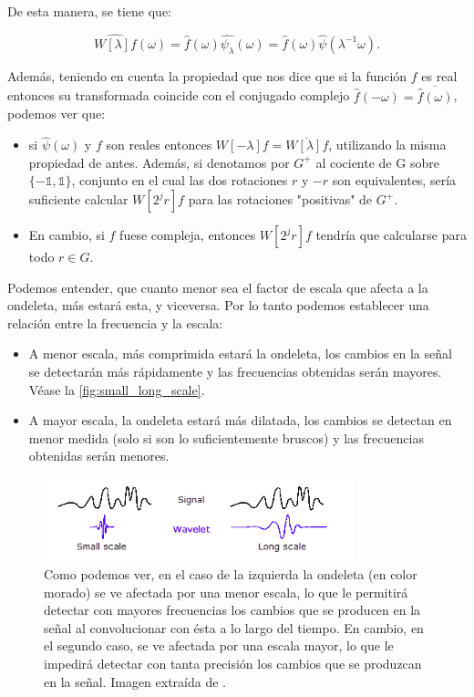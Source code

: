 De esta manera, se tiene que: 

$$\widehat{W[\lambda]f}(\omega)=\widehat{f}(\omega)\widehat{\psi_\lambda}(\omega)=\widehat{f}(\omega)\widehat{\psi}(\lambda^{-1}\omega).$$

\noindent Además, teniendo en cuenta la propiedad que nos dice que si la función $f$ es real entonces su transformada coincide con el conjugado complejo $\widehat{f}(-\omega)=\overline{\widehat{f}(\omega)}$, podemos ver que: 

\begin{itemize}
  \item si $\widehat{\psi}(\omega)$ y $f$ son reales entonces $W[-\lambda]f= \overline{W[\lambda]f}$, utilizando la misma propiedad de antes. Además, si denotamos por $G^{+}$ al cociente de G sobre $\lbrace-\mathbb{1},\mathbb{1}\rbrace$, conjunto en el cual las dos rotaciones $r$ y $-r$ son equivalentes, sería suficiente calcular $W[2^jr]f$ para las rotaciones "positivas" de $G^{+}$.
  \item En cambio, si $f$ fuese compleja, entonces $W[2^jr]f$ tendría que calcularse para todo $r \in G$.
\end{itemize}

\medskip
 
\noindent Podemos entender, que cuanto menor sea el factor de escala que afecta a la ondeleta, más  estará esta, y viceversa. Por lo tanto podemos establecer una relación entre la frecuencia y la escala: 

\begin{itemize}
  \item A menor escala, más comprimida estará la ondeleta, los cambios en la señal se detectarán más rápidamente y las frecuencias obtenidas serán mayores. Véase la \autoref{fig:small_long_scale}.
  \item A mayor escala, la ondeleta estará más dilatada, los cambios se detectan en menor medida (solo si son lo suficientemente bruscos) y las frecuencias obtenidas serán menores.
\end{itemize}

\begin{figure} [!h]
  \centering
  \includegraphics[width=0.8\textwidth]{img/Relacion_escala_frecuencia.png}
  \caption{Como podemos ver, en el caso de la izquierda la ondeleta (en color morado) se ve afectada por una menor escala, lo que le permitirá detectar con mayores frecuencias los cambios que se producen en la señal al convolucionar con ésta a lo largo del tiempo. En cambio, en el segundo caso, se ve afectada por una escala mayor, lo que le impedirá detectar con tanta precisión los cambios que se produzcan en la señal. Imagen extraída de \cite{WAVELETS}.}
  \label{fig:small_long_scale}
\end{figure}

